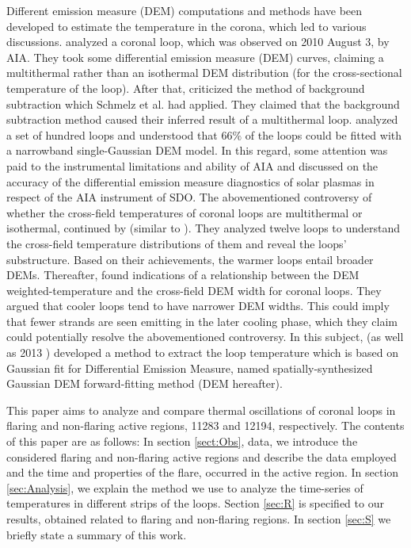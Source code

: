 \documentclass[oneside,onecolumn]{article}
\begin{document}
Different emission measure (DEM) computations and methods have been developed to estimate the temperature in the corona, which led to various discussions. \citet{ref:Schmelz2010} analyzed a coronal loop, which was observed on 2010 August 3, by AIA. They took some differential emission measure (DEM) curves, claiming a multithermal rather than an isothermal DEM distribution (for the cross-sectional temperature of the loop). After that, \citet{ref:Aschwanden2011} criticized the method of background subtraction which Schmelz et al. had applied. They claimed that the background subtraction method caused their inferred result of a multithermal loop. \citet{ref:Aschwanden2011} analyzed a set of hundred loops and understood that 66$\%$ of the loops could be fitted with a narrowband single-Gaussian DEM model. In this regard, some attention was paid to the instrumental limitations and ability of AIA and \citet{ref:Guennou2012a,ref:Guennou2012b} discussed on the accuracy of the differential emission measure diagnostics of solar plasmas in respect of the AIA instrument of SDO. The abovementioned controversy of whether the cross-field temperatures of coronal loops are multithermal or isothermal, continued by \citet{ref:Schmelz2013} (similar to \citet{ref:Schmelz2011}). They analyzed twelve loops to understand the cross-field temperature distributions of them and reveal the loops' substructure. Based on their achievements, the warmer loops entail broader DEMs. Thereafter, \citet{ref:Schmelz2014} found indications of a relationship between the DEM weighted-temperature and the cross-field DEM width for coronal loops. They argued that cooler loops tend to have narrower DEM widths. This could imply that fewer strands are seen emitting in the later cooling phase, which they claim could potentially resolve the abovementioned controversy. In this subject, \citet{ref:Aschwanden2015} (as well as 2013 \citep{ref:Aschwanden2013}) developed a method to extract the loop temperature which is based on Gaussian fit for Differential Emission Measure, named spatially-synthesized Gaussian DEM forward-fitting method (DEM hereafter).


This paper aims to analyze and compare thermal oscillations of coronal loops in flaring and non-flaring active regions, 11283 and 12194, respectively. The contents of this paper are as follows: In section \ref{sect:Obs}, data, we introduce the considered flaring and non-flaring active regions and describe the data employed and the time and properties of the flare, occurred in the active region. In section \ref{sec:Analysis}, we explain the method we use to analyze the time-series of temperatures in different strips of the loops. Section \ref{sec:R} is specified to our results, obtained related to flaring and non-flaring regions. In section \ref{sec:S} we briefly state a summary of this work.
\end{document}
